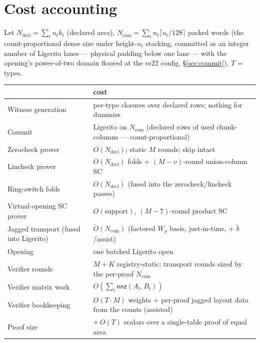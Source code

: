 \documentclass[11pt]{article}
\newcommand{\nnz}{\mathsf{nnz}}
\theoremstyle{definition}
\begin{document}
\section{Cost accounting}\label{sec:costs}

Let $N_{\mathrm{decl}} = \sum_t n_t k_t$ (declared area),
$N_{\mathrm{com}} = \sum_t n_t \lceil u_t/128\rceil$ packed words (the
count-proportional dense size under height-$n_t$ stacking, committed
as an integer number of Ligerito lanes --- physical padding below one
lane --- with the opening's power-of-two domain floored at the $m22$
config, \S\ref{sec:commit}), $T$ = types.

\begin{center}
\begin{tabular}{@{}ll@{}}
\toprule
 & \textbf{cost} \\
\midrule
Witness generation & per-type closures over declared rows; nothing for dummies \\
Commit & Ligerito on $N_{\mathrm{com}}$ (declared rows of used chunk-columns --- count-proportional) \\
Zerocheck prover & $O(N_{\mathrm{decl}})$; static $M$ rounds; skip intact \\
Lincheck prover & $O(N_{\mathrm{decl}})$ folds $+$ $(M{-}\nu)$-round union-column SC \\
Ring-switch folds & $O(N_{\mathrm{decl}})$ (fused into the zerocheck/lincheck passes) \\
Virtual-opening SC prover & $O(\text{support})$, $(M{-}7)$-round product SC \\
Jagged transport (fused into Ligerito) & $\tilde O(N_{\mathrm{com}})$ (factored $W_\rho$ basis, just-in-time, $+$ $\tilde b$/assist) \\
Opening & one batched Ligerito open \\
\midrule
Verifier rounds & $M + K$ registry-static; transport rounds sized by the per-proof $N_{\mathrm{com}}$ \\
Verifier matrix work & $O(\sum_t \nnz(A_t,B_t))$ \\
Verifier bookkeeping & $O(T \cdot M)$ weights $+$ per-proof jagged layout data from the counts (assisted) \\
Proof size & $+\,O(T)$ scalars over a single-table proof of equal area \\
\bottomrule
\end{tabular}
\end{center}
\end{document}
